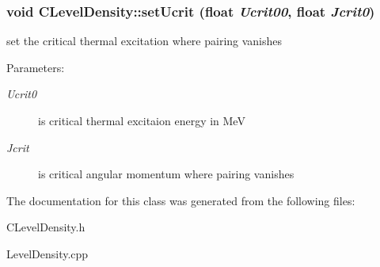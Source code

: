 \subsubsection{\setlength{\rightskip}{0pt plus 5cm}void CLevel\-Density::set\-Ucrit (float {\em Ucrit00}, float {\em Jcrit0})\hspace{0.3cm}{\tt  [static]}}\label{classCLevelDensity_a4e82b07c7b1beb20fc91a4a2ebf9725}


set the critical thermal excitation where pairing vanishes \begin{Desc}
\item[Parameters:]
\begin{description}
\item[{\em Ucrit0}]is critical thermal excitaion energy in Me\-V \item[{\em Jcrit}]is critical angular momentum where pairing vanishes \end{description}
\end{Desc}


The documentation for this class was generated from the following files:\begin{CompactItemize}
\item 
CLevel\-Density.h\item 
Level\-Density.cpp\end{CompactItemize}
